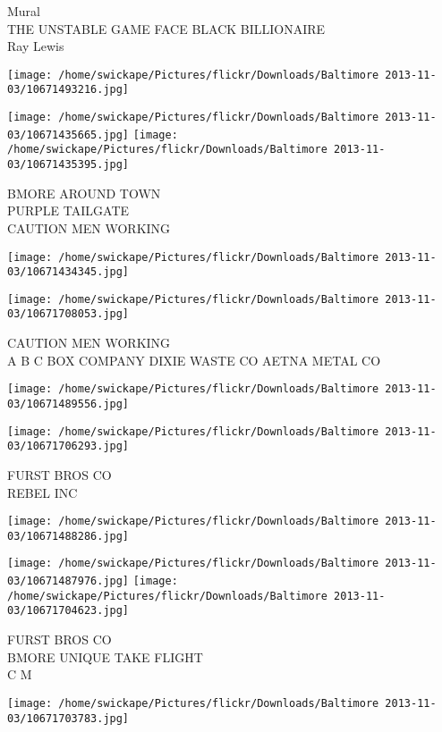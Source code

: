 \documentclass[10pt,letterpaper]{article}
\begin{document}
Mural\\
THE UNSTABLE GAME FACE BLACK BILLIONAIRE\\
Ray Lewis
\pagebreak

\texttt{[image: /home/swickape/Pictures/flickr/Downloads/Baltimore 2013-11-03/10671493216.jpg]}

\vspace{0.25in}
\texttt{[image: /home/swickape/Pictures/flickr/Downloads/Baltimore 2013-11-03/10671435665.jpg]}
\texttt{[image: /home/swickape/Pictures/flickr/Downloads/Baltimore 2013-11-03/10671435395.jpg]}

BMORE AROUND TOWN\\
PURPLE TAILGATE\\
CAUTION MEN WORKING
\pagebreak

\texttt{[image: /home/swickape/Pictures/flickr/Downloads/Baltimore 2013-11-03/10671434345.jpg]}

\vspace{0.25in}
\texttt{[image: /home/swickape/Pictures/flickr/Downloads/Baltimore 2013-11-03/10671708053.jpg]}

CAUTION MEN WORKING\\
A B C BOX COMPANY DIXIE WASTE CO AETNA METAL CO
\pagebreak

\texttt{[image: /home/swickape/Pictures/flickr/Downloads/Baltimore 2013-11-03/10671489556.jpg]}

\vspace{0.25in}
\texttt{[image: /home/swickape/Pictures/flickr/Downloads/Baltimore 2013-11-03/10671706293.jpg]}

FURST BROS CO\\
REBEL INC
\pagebreak

\texttt{[image: /home/swickape/Pictures/flickr/Downloads/Baltimore 2013-11-03/10671488286.jpg]}

\vspace{0.25in}
\texttt{[image: /home/swickape/Pictures/flickr/Downloads/Baltimore 2013-11-03/10671487976.jpg]}
\texttt{[image: /home/swickape/Pictures/flickr/Downloads/Baltimore 2013-11-03/10671704623.jpg]}

FURST BROS CO\\
BMORE UNIQUE TAKE FLIGHT\\
C M
\pagebreak

\texttt{[image: /home/swickape/Pictures/flickr/Downloads/Baltimore 2013-11-03/10671703783.jpg]}
\end{document}
